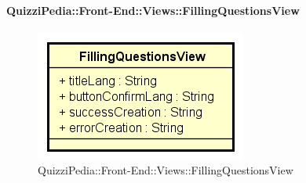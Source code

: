 \paragraph{QuizziPedia::Front-End::Views::FillingQuestionsView}
\begin{figure} [ht]
	\centering
	\includegraphics[scale=0.45]{UML/Classi/Front-End/QuizziPedia_Front-end_Views_FillingQuestionsView.png}
	\caption{QuizziPedia::Front-End::Views::FillingQuestionsView}
\end{figure} \FloatBarrier
